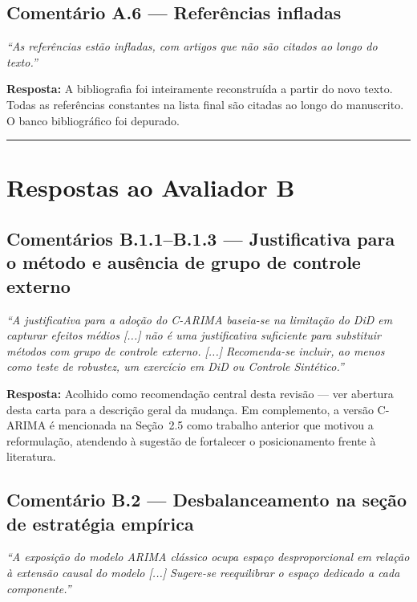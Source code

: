 \documentclass[a4paper,12pt]{article}
\newcommand{\avA}[1]{\textcolor{corA}{\textit{#1}}}
\newcommand{\avB}[1]{\textcolor{corB}{\textit{#1}}}
\newcommand{\resposta}[1]{\noindent\textbf{Resposta:} #1}
\begin{document}
\bigskip

\subsection*{Comentário A.6 — Referências infladas}

\avA{``As referências estão infladas, com artigos que não são citados ao longo do
texto.''}

\bigskip

\resposta{A bibliografia foi inteiramente reconstruída a partir do novo texto. Todas as
referências constantes na lista final são citadas ao longo do manuscrito. O banco
bibliográfico foi depurado.}

\bigskip
\hrule
\bigskip

\section*{Respostas ao Avaliador B}

\subsection*{Comentários B.1.1--B.1.3 — Justificativa para o método e ausência de
grupo de controle externo}

\avB{``A justificativa para a adoção do C-ARIMA baseia-se na limitação do DiD em
capturar efeitos médios [...] não é uma justificativa suficiente para substituir métodos
com grupo de controle externo. [...] Recomenda-se incluir, ao menos como teste de
robustez, um exercício em DiD ou Controle Sintético.''}

\bigskip

\resposta{Acolhido como recomendação central desta revisão — ver abertura desta carta
para a descrição geral da mudança. Em complemento, a versão C-ARIMA é mencionada na
Seção~2.5 como trabalho anterior que motivou a reformulação, atendendo à sugestão de
fortalecer o posicionamento frente à literatura.}

\bigskip

\subsection*{Comentário B.2 — Desbalanceamento na seção de estratégia empírica}

\avB{``A exposição do modelo ARIMA clássico ocupa espaço desproporcional em relação à
extensão causal do modelo [...] Sugere-se reequilibrar o espaço dedicado a cada
componente.''}
\end{document}
